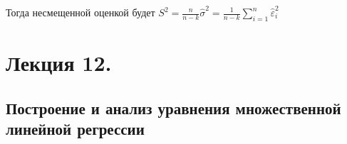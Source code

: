 \documentclass[12pt]{article}
\begin{document}
Тогда несмещенной оценкой будет $S^2 = \frac{n}{n - k} \hat \sigma^2 = \frac{1}{n - k} \sum_{i = 1}^n \hat \varepsilon_i^2$

%









\section{Лекция 12.}

\subsection{Построение и анализ уравнения множественной линейной регрессии}
\end{document}
